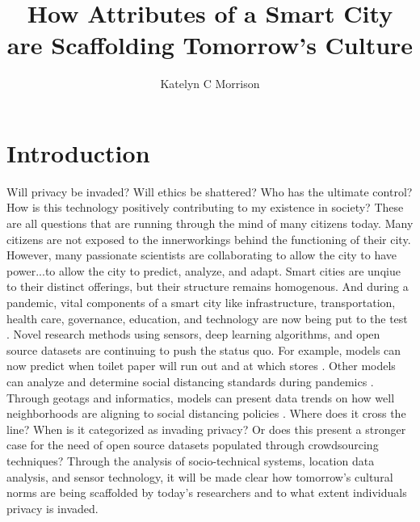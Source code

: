 \documentclass[12pt]{article}
\title{
    How Attributes of a Smart City are Scaffolding Tomorrow's Culture
}
\author{Katelyn C Morrison}
\begin{document}
\maketitle

\section*{Introduction}
Will privacy be invaded? Will ethics be shattered? Who has the ultimate control? How
is this technology positively contributing to my existence in society?
These are all questions that are running through the mind of many citizens today. 
Many citizens are not exposed to the innerworkings behind the functioning of their city.
However, many passionate scientists are collaborating to allow the city to have power...to allow the city to predict, analyze, and adapt.
Smart cities are unqiue to their distinct offerings, but their structure remains homogenous. 
And during a pandemic, vital components of a smart city like infrastructure, transportation, 
health care, governance, education, and technology are now being put to the test \cite{DefiningSmartCities}.
Novel research methods using sensors, deep learning algorithms, and open source datasets are continuing to push the status quo. 
For example, models can now predict
when toilet paper will run out and at which stores \cite{GotTP}. Other models can analyze and determine
social distancing standards during pandemics \cite{das_james_2020}. Through geotags and informatics,
models can present data trends on how well neighborhoods are aligning to social distancing policies \cite{gazette_2020}.
Where does it cross the line? When is it categorized as invading privacy? Or does this present a
stronger case for the need of open source datasets populated through crowdsourcing techniques? 
Through the analysis of socio-technical systems, location data analysis, and sensor technology, 
it will be made clear how tomorrow's
cultural norms are being scaffolded by today's researchers and to what extent individuals 
privacy is invaded.
\end{document}

